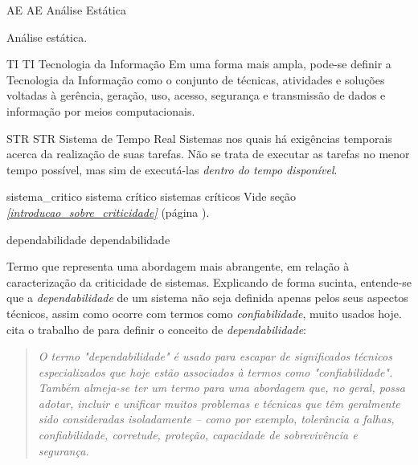 \novoacronimo
    {AE} %
    {AE} %
    {{Análise Estática}} %
    {
        Análise estática.
        
    }

\novoacronimo
    {TI}
    {TI}
    {{Tecnologia da Informação}}
    {
        Em uma forma mais ampla, pode-se definir a Tecnologia da 
        Informação 
        como o conjunto de técnicas, atividades e soluções voltadas à 
        gerência, 
        geração, uso, acesso, segurança e transmissão de dados e 
        informação por 
        meios computacionais.
    }

\novoacronimo
    {STR}
    {STR}
    {{Sistema de Tempo Real}}
    {
        Sistemas nos quais há exigências temporais acerca da realização de suas 
        tarefas. Não se trata de executar as tarefas no menor tempo possível, 
        mas sim de executá-las \emph{dentro do tempo disponível}.
    }


\novadefinicaopl
    {sistema_critico}
    {sistema crítico}
    {sistemas críticos}
    {
        Vide seção \emph{\ref{introducao_sobre_criticidade}} (página 
        \pageref{introducao_sobre_criticidade}).
    }

\novadefinicao
    {dependabilidade}
    {dependabilidade}
    {
        Termo que representa uma abordagem mais abrangente, em relação à 
        caracterização da criticidade de sistemas. Explicando de forma sucinta, 
        entende-se que a \emph{dependabilidade} de um sistema não 
        seja definida apenas pelos seus aspectos técnicos, assim como 
        ocorre com termos como \emph{confiabilidade}, muito usados 
        hoje. \citeauthor{rushby_critical_1994} cita o trabalho de 
         para definir o conceito 
        de \emph{dependabilidade}:
        \blockquote{\textit{
            O termo \emph{"dependabilidade"} é usado para escapar de 
            significados técnicos especializados que hoje estão 
            associados à termos como \emph{"confiabilidade"}. Também almeja-se 
            ter um termo para uma abordagem que, no geral, possa adotar, 
            incluir e unificar muitos problemas e técnicas que têm geralmente 
            sido consideradas isoladamente -- como por exemplo, tolerância a 
            falhas, confiabilidade, corretude, proteção, capacidade de 
            sobrevivência e segurança.} \cite{rushby_critical_1994}
        }
    }

